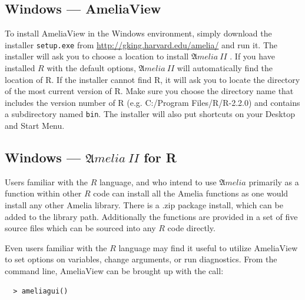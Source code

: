 \documentclass[12pt,titlepage]{article}
\newcommand{\Amelia}{\ensuremath{\mathfrak Amelia} }
\newcommand{\AmeliaII}{\ensuremath{\mathfrak Amelia~II} }
\begin{document}
\subsection{Windows --- AmeliaView}
\label{sec:win-install}
To install AmeliaView in the Windows environment, simply download the
installer \texttt{setup.exe} from
\url{http://gking.harvard.edu/amelia/} and run it.  The installer will
ask you to choose a location to install \AmeliaII.  If you have
installed $R$ with the default options, \AmeliaII will automatically
find the location of R.  If the installer cannot find R, it will ask
you to locate the directory of the most current version of R.  Make
sure you choose the directory name that includes the version number of
R (e.g. C:/Program Files/R/R-2.2.0) and contains a subdirectory named
\texttt{bin}.  The installer will also put shortcuts on your Desktop
and Start Menu.

\subsection{Windows --- \AmeliaII for R}

Users familiar with the $R$ language, and who intend to use \Amelia
primarily as a function within other $R$ code can install all the
Amelia functions as one would install any other Amelia library.  There
is a .zip package install, which can be added to the library path.
Additionally the functions are provided in a set of five source files
which can be sourced into any $R$ code directly.

Even users familiar with the $R$ language may find it useful to
utilize AmeliaView to set options on variables, change arguments, or
run diagnostics.  From the command line, AmeliaView can be brought up
with the call:
  \begin{verbatim}
  > ameliagui()
  \end{verbatim}
\end{document}
